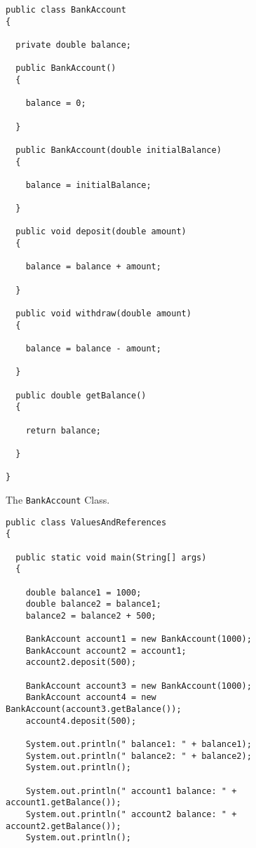 \documentclass[12pt]{article}
\begin{document}
\begin{enumerate}
\newpage

\begin{figure}[t]

\footnotesize{
\begin{verbatim}
public class BankAccount
{  

  private double balance; 

  public BankAccount()
  { 

    balance = 0;
   
  }

  public BankAccount(double initialBalance)
  {  
    
    balance = initialBalance;
  
  }
 
  public void deposit(double amount) 
  { 
    
    balance = balance + amount;
   
  }
  
  public void withdraw(double amount) 
  {  
    
    balance = balance - amount;
   
  }
  
  public double getBalance()
  { 

    return balance; 
   
  }

}
\end{verbatim}
}
\caption{The {\tt BankAccount} Class.}
\label{BankAccount}
\end{figure}

\begin{figure}[t]

\footnotesize{
\begin{verbatim}
public class ValuesAndReferences
{
  
  public static void main(String[] args)
  {

    double balance1 = 1000;
    double balance2 = balance1;
    balance2 = balance2 + 500;

    BankAccount account1 = new BankAccount(1000);
    BankAccount account2 = account1;
    account2.deposit(500);
    
    BankAccount account3 = new BankAccount(1000);
    BankAccount account4 = new BankAccount(account3.getBalance());
    account4.deposit(500);

    System.out.println(" balance1: " + balance1);
    System.out.println(" balance2: " + balance2);
    System.out.println();

    System.out.println(" account1 balance: " + account1.getBalance());
    System.out.println(" account2 balance: " + account2.getBalance());
    System.out.println();


\end{verbatim}}
\end{figure}
\end{enumerate}
\end{document}
